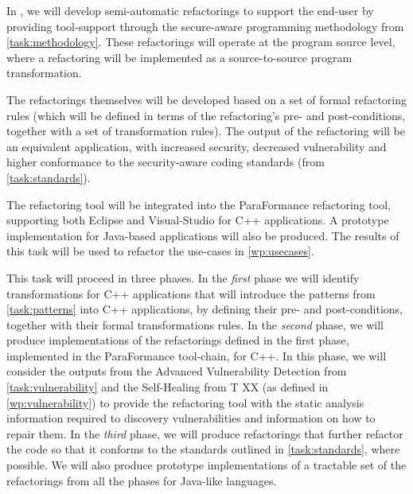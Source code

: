 \begin{Workpackage}{\thewpno}
\begin{Task}
\TaskResults{%
}
\TaskHeader{}

In  \theTask{}, we will develop semi-automatic refactorings to support the end-user by providing tool-support through the  secure-aware programming methodology from \ref{task:methodology}. These refactorings will operate at the program source level, where a refactoring will be implemented as a source-to-source program transformation. 

The refactorings themselves will be developed based on a set of formal refactoring rules (which will be defined in terms of the refactoring's pre- and post-conditions, together with a set of transformation rules). The output of the refactoring will be an equivalent application, with increased security, decreased vulnerability and higher conformance to the security-aware coding standards (from \ref{task:standards}).

The refactoring tool will be integrated into the ParaFormance refactoring tool, supporting both Eclipse and Visual-Studio for C++ applications. A prototype implementation for Java-based applications will also be produced. The results of this task will be used to refactor the use-cases in \ref{wp:usecases}.

This task will proceed in three phases. In the \emph{first} phase we will identify transformations for C++ applications that will introduce the patterns from \ref{task:patterns} into C++ applications, by defining their pre- and post-conditions, together with their formal transformations rules. In the \emph{second} phase, we will produce implementations of the refactorings defined in the first phase, implemented in the ParaFormance tool-chain, for C++. In this phase, we will consider the outputs from the Advanced Vulnerability Detection from \ref{task:vulnerability} and the Self-Healing from T XX (as defined in \ref{wp:vulnerability}) to provide the refactoring tool with the static analysis information required to discovery vulnerabilities and information on how to repair them.
 In the \emph{third} phase, we will produce refactorings that further refactor the code so that it conforms to the standards outlined in \ref{task:standards}, where possible. We will also produce prototype implementations of a tractable set of the refactorings from all the phases for Java-like languages.


%
%
\end{Task}


\end{Workpackage}
